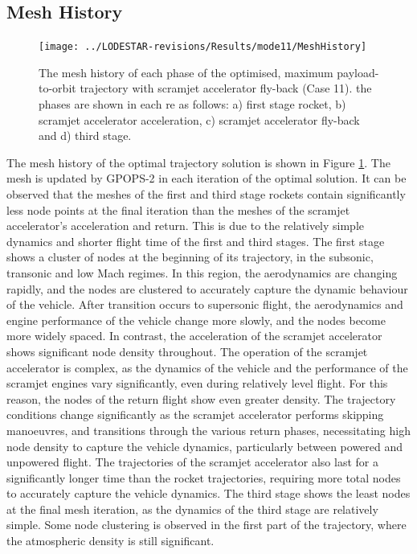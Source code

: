 \subsection{Mesh History}

\begin{figure}[ht]
	\centering
	\texttt{[image: ../LODESTAR-revisions/Results/mode11/MeshHistory]}
	\caption{The mesh history of each phase of the optimised, maximum payload-to-orbit trajectory with scramjet accelerator fly-back (Case 11). the phases are shown in each re as follows: a) first stage rocket, b) scramjet accelerator acceleration, c) scramjet accelerator fly-back and d) third stage.}
	\label{fig:MeshHistory}
\end{figure}
The mesh history of the optimal trajectory solution is shown in Figure \ref{fig:MeshHistory}. The mesh is updated by GPOPS-2 in each iteration of the optimal solution. It can be observed that the meshes of the first and third stage rockets contain significantly less node points at the final iteration than the meshes of the scramjet accelerator's acceleration and return. This is due to the relatively simple dynamics and shorter flight time of the first and third stages. The first stage shows a cluster of nodes at the beginning of its trajectory, in the subsonic, transonic and low Mach regimes. In this region, the aerodynamics are changing rapidly, and the nodes are clustered to accurately capture the dynamic behaviour of the vehicle. After transition occurs to supersonic flight, the aerodynamics and engine performance of the vehicle change more slowly, and the nodes become more widely spaced. In contrast, the acceleration of the scramjet accelerator shows significant node density throughout. The operation of the scramjet accelerator is complex, as the dynamics of the vehicle and the performance of the scramjet engines vary significantly, even during relatively level flight. For this reason, the nodes of the return flight show even greater density. The trajectory conditions change significantly as the scramjet accelerator performs skipping manoeuvres, and transitions through the various return phases, necessitating high node density to capture the vehicle dynamics, particularly between powered and unpowered flight. The trajectories of the scramjet accelerator also last for a significantly longer time than the rocket trajectories, requiring more total nodes to accurately capture the vehicle dynamics. The third stage shows the least nodes at the final mesh iteration, as the dynamics of the third stage are relatively simple. Some node  clustering is observed in the first part of the trajectory, where the atmospheric density is still significant. 



